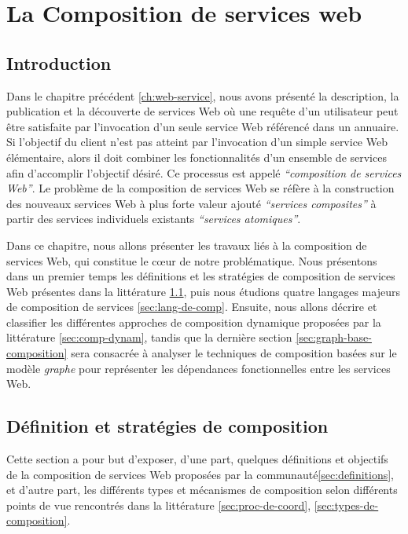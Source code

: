 \chapter{La Composition de services web}
\label{ch:composition}

\section*{Introduction}
 

Dans le chapitre précédent \ref{ch:web-service}, nous avons présenté
la description, la publication et la découverte de services Web où une
requête d'un utilisateur peut être satisfaite par l'invocation d'un
seule service Web référencé dans un annuaire. Si l'objectif du client
n'est pas atteint par l'invocation d'un simple service Web
élémentaire, alors il doit combiner les fonctionnalités d'un ensemble
de services afin d'accomplir l'objectif désiré. Ce processus est
appelé \textit{``composition de services Web''}. Le problème de la
composition de services Web se réfère à la construction des nouveaux
services Web à plus forte valeur ajouté \textit{``services
  composites''} à partir des services individuels existants
\textit{``services atomiques''}.\bigskip

Dans ce chapitre, nous allons présenter les travaux liés à la
composition de services Web, qui constitue le cœur de notre
problématique. Nous présentons dans un premier temps les définitions
et les stratégies de composition de services Web présentes dans la
littérature \ref{sec:defs}, puis nous étudions quatre langages majeurs
de composition de services \ref{sec:lang-de-comp}. Ensuite, nous
allons décrire et classifier les différentes approches de composition
dynamique proposées par la littérature \ref{sec:comp-dynam}, tandis
que la dernière section \ref{sec:graph-base-composition} sera
consacrée à analyser le techniques de composition basées sur le modèle
\textit{graphe} pour représenter les dépendances fonctionnelles entre
les services Web.

\newpage
\section{Définition et stratégies de composition}
\label{sec:defs}
Cette section a pour but d'exposer, d'une part, quelques définitions
et objectifs de la composition de services Web proposées par la
communauté\ref{sec:definitions}, et d'autre part, les différents types
et mécanismes de composition selon différents points de vue rencontrés
dans la littérature \ref{sec:proc-de-coord},
\ref{sec:types-de-composition}.

